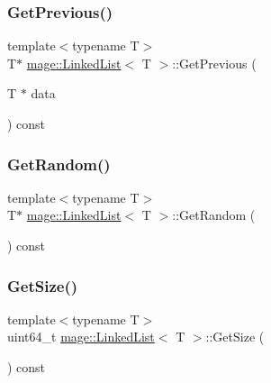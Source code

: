 \hypertarget{classmage_1_1_linked_list_a48a61ad79c7a7f4d460d56867ce62cf4}{}\label{classmage_1_1_linked_list_a48a61ad79c7a7f4d460d56867ce62cf4} 
\subsubsection{\texorpdfstring{Get\+Previous()}{GetPrevious()}}
{\footnotesize\ttfamily template$<$typename T$>$ \\
T$\ast$ \hyperlink{classmage_1_1_linked_list}{mage\+::\+Linked\+List}$<$ T $>$\+::Get\+Previous (\begin{DoxyParamCaption}\item[{T $\ast$}]{data }\end{DoxyParamCaption}) const}

\hypertarget{classmage_1_1_linked_list_aec571022e5fa10e0afea286e4427eb89}{}\label{classmage_1_1_linked_list_aec571022e5fa10e0afea286e4427eb89} 
\subsubsection{\texorpdfstring{Get\+Random()}{GetRandom()}}
{\footnotesize\ttfamily template$<$typename T$>$ \\
T$\ast$ \hyperlink{classmage_1_1_linked_list}{mage\+::\+Linked\+List}$<$ T $>$\+::Get\+Random (\begin{DoxyParamCaption}{ }\end{DoxyParamCaption}) const}

\hypertarget{classmage_1_1_linked_list_a8d033278680a0053e30cba91b27941a1}{}\label{classmage_1_1_linked_list_a8d033278680a0053e30cba91b27941a1} 
\subsubsection{\texorpdfstring{Get\+Size()}{GetSize()}}
{\footnotesize\ttfamily template$<$typename T$>$ \\
uint64\+\_\+t \hyperlink{classmage_1_1_linked_list}{mage\+::\+Linked\+List}$<$ T $>$\+::Get\+Size (\begin{DoxyParamCaption}{ }\end{DoxyParamCaption}) const}

